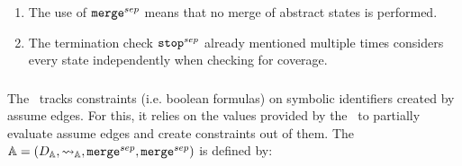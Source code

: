\begin{enumerate}[leftmargin=*, label=\arabic*.]
\item The use of $\texttt{merge}^{sep}$ means that no merge of abstract states is performed.
\item The termination check $\texttt{stop}^{sep}$ already mentioned multiple times considers every state independently when checking for coverage.

\end{enumerate}

\subsubsection{\ConstraintsCPA}

The \constraintsCPA\ tracks constraints (i.e. boolean formulas) on symbolic identifiers created by assume edges.
For this, it relies on the values provided by the \symbolicValueAnalysisCPA\ to partially evaluate assume edges and create constraints out of them.
The \constraintsCPA\ $\mathbb{A} = (D_{\mathbb{A}}, \rightsquigarrow_{\mathbb{A}}, \texttt{merge}^{sep}, \texttt{merge}^{sep})$ is defined by:
